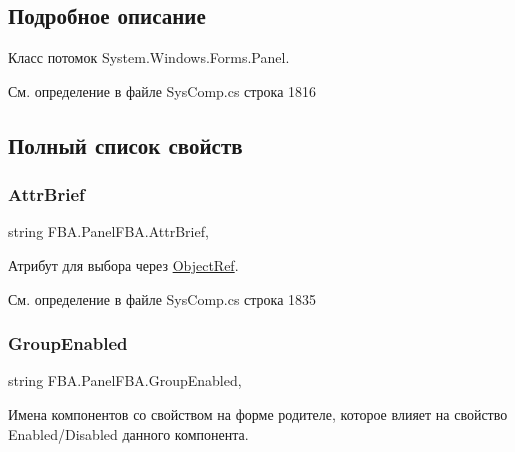 \subsection{Подробное описание}
Класс потомок System.\+Windows.\+Forms.\+Panel. 



См. определение в файле Sys\+Comp.\+cs строка 1816



\subsection{Полный список свойств}
\mbox{\label{class_f_b_a_1_1_panel_f_b_a_a23edcf7c4c61f67375160cddde67eeb4}} 
\subsubsection{\texorpdfstring{Attr\+Brief}{AttrBrief}}
{\footnotesize\ttfamily string F\+B\+A.\+Panel\+F\+B\+A.\+Attr\+Brief\hspace{0.3cm}{\ttfamily [get]}, {\ttfamily [set]}}



Атрибут для выбора через \mbox{\hyperlink{class_f_b_a_1_1_object_ref}{Object\+Ref}}. ~\newline




См. определение в файле Sys\+Comp.\+cs строка 1835

\mbox{\label{class_f_b_a_1_1_panel_f_b_a_aed9278b2e094c475304961c1ff4194ef}} 
\subsubsection{\texorpdfstring{Group\+Enabled}{GroupEnabled}}
{\footnotesize\ttfamily string F\+B\+A.\+Panel\+F\+B\+A.\+Group\+Enabled\hspace{0.3cm}{\ttfamily [get]}, {\ttfamily [set]}}



Имена компонентов со свойством на форме родителе, которое влияет на свойство Enabled/\+Disabled данного компонента. ~\newline





